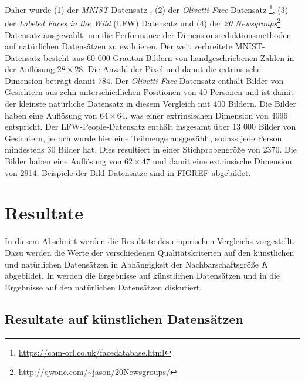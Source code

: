Daher wurde (1) der \textit{MNIST}-Datensatz \parencite{LeCun.2010}, (2) der \textit{Olivetti Face}-Datensatz
\footnote{\url{https://cam-orl.co.uk/facedatabase.html}}, (3) der \textit{Labeled Faces in the
	Wild} (LFW) Datensatz \parencite{GaryB.Huang.2007} und (4) der \textit{20
	Newsgroups}\footnote{\url{http://qwone.com/~jason/20Newsgroups/}} Datensatz ausgewählt, um die
Performance der Dimensionsreduktionsmethoden auf natürlichen Datensätzen zu evaluieren. Der weit
verbreitete MNIST-Datensatz besteht aus 60 000 Grauton-Bildern von handgeschriebenen Zahlen in der
Auflösung $28 \times 28$. Die Anzahl der Pixel und damit die extrinsische Dimension beträgt damit
784. Der \textit{Olivetti Face}-Datensatz enthält Bilder von Gesichtern aus zehn unterschiedlichen
Positionen von 40 Personen und ist damit der kleinste natürliche Datensatz in diesem Vergleich mit
400 Bildern. Die Bilder haben eine Auflösung von $64 \times 64$, was einer extrinsischen Dimension
von 4096 entspricht. Der LFW-People-Datensatz enthält insgesamt über 13 000 Bilder von Gesichtern,
jedoch wurde hier eine Teilmenge ausgewählt, sodass jede Person mindestens 30 Bilder hat. Dies
resultiert in einer Stichprobengröße von 2370. Die Bilder haben eine Auflösung von $62 \times 47$
und damit eine extrinsische Dimension von 2914. Beispiele der Bild-Datensätze sind in FIGREF
 abgebildet.
\section{Resultate}
\label{ch:Vergleich:sec:Resultate}

In diesem Abschnitt werden die Resultate des empirischen Vergleichs vorgestellt. Dazu werden die
Werte der verschiedenen Qualitätskriterien auf den künstlichen und natürlichen Datensätzen in
Abhängigkeit der Nachbarschaftsgröße $K$ abgebildet. In
 werden die Ergebnisse auf künstlichen Datensätzen
und in  die Ergebnisse auf den natürlichen
Datensätzen diskutiert.

\subsection{Resultate auf künstlichen Datensätzen}
\label{ch:Vergleich:sec:Resultate:kuenstlich}

